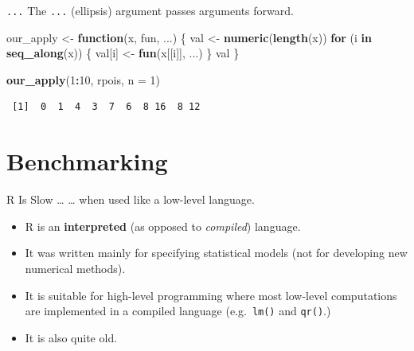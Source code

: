 \documentclass[
  ignorenonframetext,
  aspectratio=1610,
  onlytextwidth]{beamer}
\newenvironment{Shaded}{\begin{snugshade}}{\end{snugshade}}
\newcommand{\AttributeTok}[1]{\textcolor[rgb]{0.13,0.29,0.53}{#1}}
\newcommand{\ControlFlowTok}[1]{\textcolor[rgb]{0.13,0.29,0.53}{\textbf{#1}}}
\newcommand{\DecValTok}[1]{\textcolor[rgb]{0.00,0.00,0.81}{#1}}
\newcommand{\FunctionTok}[1]{\textcolor[rgb]{0.13,0.29,0.53}{\textbf{#1}}}
\newcommand{\NormalTok}[1]{#1}
\newcommand{\OtherTok}[1]{\textcolor[rgb]{0.56,0.35,0.01}{#1}}
\newcommand{\SpecialCharTok}[1]{\textcolor[rgb]{0.81,0.36,0.00}{\textbf{#1}}}
\providecommand{\tightlist}{}
\begin{document}
\begin{frame}[fragile]{\texttt{...}}
\label{section}
The \texttt{...} (ellipsis) argument passes arguments forward.

\begin{Shaded}
\begin{Highlighting}[]
\NormalTok{our\_apply }\OtherTok{\textless{}{-}} \ControlFlowTok{function}\NormalTok{(x, fun, ...) \{}
\NormalTok{  val }\OtherTok{\textless{}{-}} \FunctionTok{numeric}\NormalTok{(}\FunctionTok{length}\NormalTok{(x))}
  \ControlFlowTok{for}\NormalTok{ (i }\ControlFlowTok{in} \FunctionTok{seq\_along}\NormalTok{(x)) \{}
\NormalTok{    val[i] }\OtherTok{\textless{}{-}} \FunctionTok{fun}\NormalTok{(x[[i]], ...)}
\NormalTok{  \}}
\NormalTok{  val}
\NormalTok{\}}
\end{Highlighting}
\end{Shaded}

\pause

\begin{Shaded}
\begin{Highlighting}[]
\FunctionTok{our\_apply}\NormalTok{(}\DecValTok{1}\SpecialCharTok{:}\DecValTok{10}\NormalTok{, rpois, }\AttributeTok{n =} \DecValTok{1}\NormalTok{)}
\end{Highlighting}
\end{Shaded}

\begin{verbatim}
 [1]  0  1  4  3  7  6  8 16  8 12
\end{verbatim}
\end{frame}

\section{Benchmarking}\label{benchmarking}

\begin{frame}[fragile]{R Is Slow \ldots{}}
\label{r-is-slow}
\ldots{} when used like a low-level language.

\begin{itemize}[<+->]
\tightlist
\item
  R is an \textbf{interpreted} (as opposed to \emph{compiled}) language.
\item
  It was written mainly for specifying statistical models (not for
  developing new numerical methods).
\item
  It is suitable for high-level programming where most low-level
  computations are implemented in a compiled language
  (e.g.~\texttt{lm()} and \texttt{qr()}.)
\item
  It is also quite old.
\end{itemize}
\end{frame}
\end{document}
